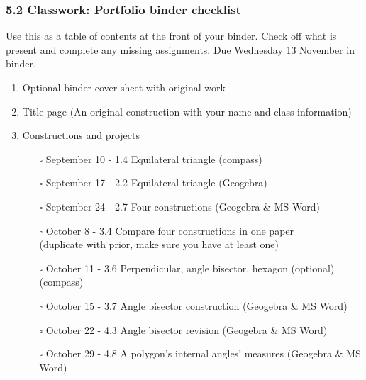 \documentclass[12pt, twoside]{article}
\begin{document}
\subsubsection*{5.2 Classwork: Portfolio binder checklist}
Use this as a table of contents at the front of your binder. Check off what is present and complete any missing assignments. Due Wednesday 13 November in binder.
  \begin{enumerate}

  \item Optional binder cover sheet with original work
  \item Title page (An original construction with your name and class information)
  \item Constructions and projects
    \begin{itemize}
      \item[$\square$] September 10 - 1.4 Equilateral triangle (compass)
      \item[$\square$] September 17 - 2.2 Equilateral triangle (Geogebra)
      \item[$\square$] September 24 - 2.7 Four constructions (Geogebra \& MS Word)
      \item[$\square$] October 8 - 3.4 Compare four constructions in one paper \\(duplicate with prior, make sure you have at least one)
      \item[$\square$] October 11 - 3.6 Perpendicular, angle bisector, hexagon (optional)(compass)
      \item[$\square$] October 15 - 3.7 Angle bisector construction (Geogebra \& MS Word)
      \item[$\square$] October 22 - 4.3 Angle bisector revision (Geogebra \& MS Word)
      \item[$\square$] October 29 - 4.8 A polygon’s internal angles' measures (Geogebra \& MS Word)
    \end{itemize}
  

\end{enumerate}
\end{document}
